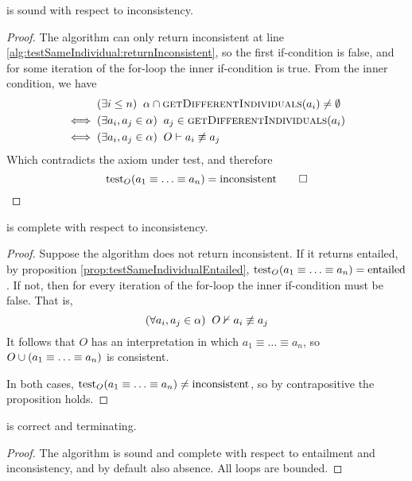 \documentclass[paper.tex]{subfiles}
\begin{document}
\begin{proposition}
   is sound with respect to inconsistency.
\end{proposition}
\begin{proof}
  The algorithm can only return inconsistent at line \ref{alg:testSameIndividual:returnInconsistent}, so the first if-condition is false, and for some iteration of the for-loop the inner if-condition is true.  From the inner condition, we have
  \begin{align*}
    & (\exists i \le n) \;\; \alpha \intersect \Call{getDifferentIndividuals}{a_i} \ne \emptyset \\
    \iff{}& (\exists a_i, a_j \in \alpha) \;\; a_j \in \Call{getDifferentIndividuals}{a_i} \\
    \iff{}& (\exists a_i, a_j \in \alpha) \;\; O \sementails a_i \not\equiv a_j
  \end{align*}
  Which contradicts the axiom under test, and therefore
  \[ \operatorname{test}_O(a_1 \equiv \ldots \equiv a_n) = \mathrm{inconsistent} \qed \]
\end{proof}

\begin{proposition}
   is complete with respect to inconsistency.
\end{proposition}
\begin{proof}
  Suppose the algorithm does not return inconsistent.  If it returns entailed, by proposition \ref{prop:testSameIndividualEntailed}, $\operatorname{test}_O(a_1 \equiv \ldots \equiv a_n) = \mathrm{entailed}$.  If not, then for every iteration of the for-loop the inner if-condition must be false.  That is,
  \[ (\forall a_i, a_j \in \alpha) \;\; O \nvdash a_i \not\equiv a_j \]
  It follows that $O$ has an interpretation in which $a_1 \equiv \ldots \equiv a_n$, so $O \cup (a_1 \equiv \ldots \equiv a_n)$ is consistent.

  In both cases, $\operatorname{test}_O(a_1 \equiv \ldots \equiv a_n) \ne \mathrm{inconsistent}$, so by contrapositive the proposition holds.
\end{proof}

\begin{theorem}
  \label{prop:testSameIndividualCorrect}
   is correct and terminating.
\end{theorem}
\begin{proof}
  The algorithm is sound and complete with respect to entailment and inconsistency, and by default also absence.  All loops are bounded.
\end{proof}
\end{document}
